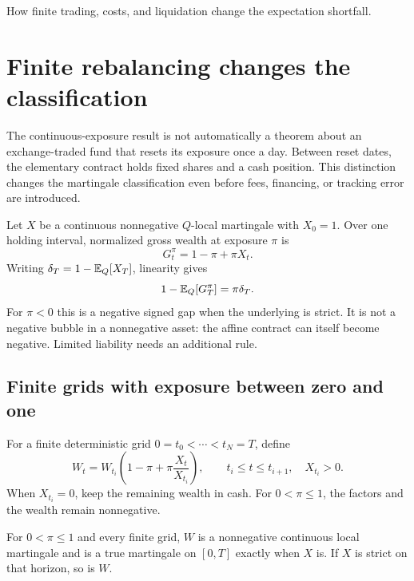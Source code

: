 {How finite trading, costs, and liquidation change the expectation shortfall.}

\section{Finite rebalancing changes the classification}\label{sec:finitefunds}
The continuous-exposure result is not automatically a theorem about an
exchange-traded fund that resets its exposure once a day. Between reset
dates, the elementary contract holds fixed shares and a cash position.
This distinction changes the martingale classification even before fees,
financing, or tracking error are introduced.

Let $X$ be a continuous nonnegative $Q$-local martingale with $X_0=1$.
Over one holding interval, normalized gross wealth at exposure $\pi$ is
\begin{equation}\label{eq:oneholding}
 G_t^\pi=1-\pi+\pi X_t.
\end{equation}
Writing $\delta_T=1-\mathbb{E}_Q[X_T]$, linearity gives
\begin{equation}\label{eq:signedgap}
 1-\mathbb{E}_Q[G_T^\pi]=\pi\delta_T.
\end{equation}
For $\pi<0$ this is a negative signed gap when the underlying is strict.
It is not a negative bubble in a nonnegative asset: the affine contract
can itself become negative. Limited liability needs an additional rule.

\subsection{Finite grids with exposure between zero and one}
For a finite deterministic grid $0=t_0<\cdots<t_N=T$, define
\begin{equation}\label{eq:gridwealth}
 W_t=W_{t_i}\left(1-\pi+\pi\frac{X_t}{X_{t_i}}\right),
 \qquad t_i\leq t\leq t_{i+1},\quad X_{t_i}>0.
\end{equation}
When $X_{t_i}=0$, keep the remaining wealth in cash. For $0<\pi\leq1$,
the factors and the wealth remain nonnegative.

\begin{proposition}\label{prop:grid}
For $0<\pi\leq1$ and every finite grid, $W$ is a nonnegative continuous
local martingale and is a true martingale on $[0,T]$ exactly when $X$ is.
If $X$ is strict on that horizon, so is $W$.
\end{proposition}

